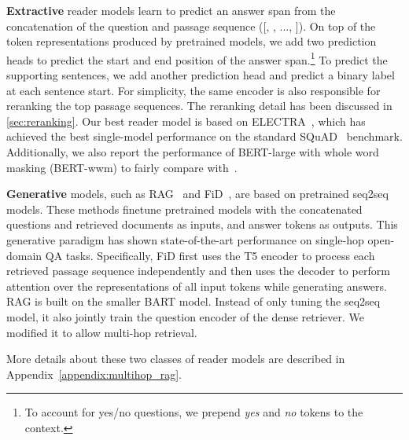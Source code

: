\documentclass{article} \usepackage{iclr2021_conference,times}
\begin{document}
\textbf{Extractive} reader models learn to predict an answer span from the concatenation of the question and passage sequence ([, , ..., ]). On top of the token representations produced by pretrained models, we add two prediction heads to predict the start and end position of the answer span.\footnote{To account for yes/no questions, we prepend \emph{yes} and \emph{no} tokens to the context.} To predict the supporting sentences, we add another prediction head and predict a binary label at each sentence start. For simplicity, the same encoder is also responsible for reranking the top  passage sequences. The reranking detail has been discussed in \cref{sec:reranking}. Our best reader model is based on ELECTRA~\citep{ELECTRA}, which has achieved the best single-model performance on the standard SQuAD~\citep{SQuAD} benchmark. Additionally, we also report the performance of BERT-large with whole word masking (BERT-wwm) to fairly compare with~\citet{GraphRecurrentRetriever}. 

\textbf{Generative} models, such as RAG~\citep{RAG} and FiD~\citep{FiD}, are based on pretrained seq2seq models. These methods finetune pretrained models with the concatenated questions and retrieved documents as inputs, and answer tokens as outputs. This generative paradigm has shown state-of-the-art performance on single-hop open-domain QA tasks. Specifically, FiD first uses the T5 encoder to process each retrieved passage sequence independently and then uses the decoder to perform attention over the representations of all input tokens while generating answers. RAG is built on the smaller BART model. Instead of only tuning the seq2seq model, it also jointly train the question encoder of the dense retriever. We modified it to allow multi-hop retrieval. 

More details about these two classes of reader models are described in Appendix~\ref{appendix:multihop_rag}.
\end{document}
